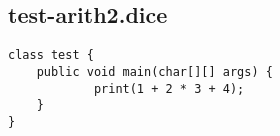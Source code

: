 \subsection{test-arith2.dice}
\begin{verbatim}
class test {
	public void main(char[][] args) {
			print(1 + 2 * 3 + 4);
	}
} 

\end{verbatim}